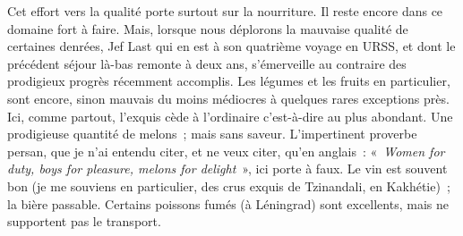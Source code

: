 \documentclass[twoside]{book} %
\newcommand{\astermono}{\medskip\centerline{\color{rubric}\large\selectfont{\syms ✻}}\medskip\par}%
\begin{document}
Cet effort vers la qualité porte surtout sur la nourriture. Il reste encore dans ce domaine fort à faire. Mais, lorsque nous déplorons la mauvaise qualité de certaines denrées, Jef Last qui en est à son quatrième voyage en URSS, et dont le précédent séjour là-bas remonte à deux ans, s’émerveille au contraire des prodigieux progrès récemment accomplis. Les légumes et les fruits en particulier, sont encore, sinon mauvais du moins médiocres à quelques rares exceptions près. Ici, comme partout, l’exquis cède à l’ordinaire c’est-à-dire au plus abondant. Une prodigieuse quantité de melons ; mais sans saveur. L’impertinent proverbe persan, que je n’ai entendu citer, et ne veux citer, qu’en anglais : « \emph{Women for duty, boys for pleasure, melons for delight} », ici porte à faux. Le vin est souvent bon (je me souviens en particulier, des crus exquis de Tzinandali, en Kakhétie) ; la bière passable. Certains poissons fumés (à Léningrad) sont excellents, mais ne supportent pas le transport.\par

\astermono
\end{document}
